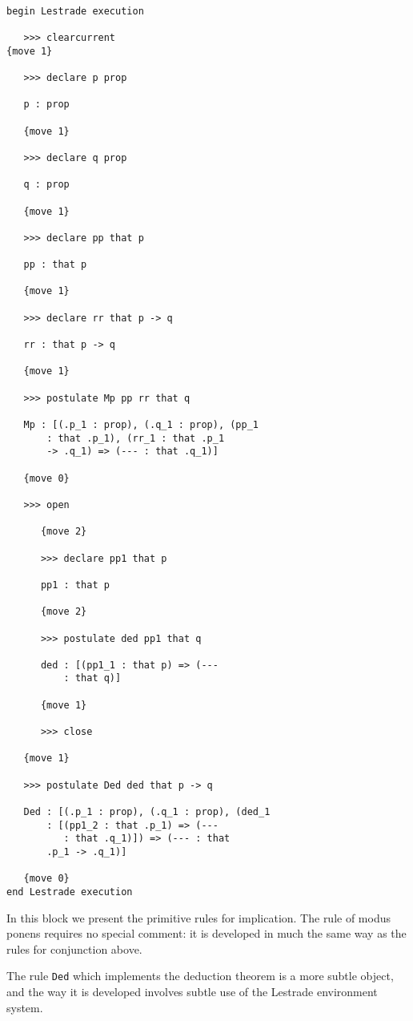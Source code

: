 \documentclass[12pt]{article}
\begin{document}
\begin{verbatim}

begin Lestrade execution

   >>> clearcurrent
{move 1}

   >>> declare p prop

   p : prop

   {move 1}

   >>> declare q prop

   q : prop

   {move 1}

   >>> declare pp that p

   pp : that p

   {move 1}

   >>> declare rr that p -> q

   rr : that p -> q

   {move 1}

   >>> postulate Mp pp rr that q

   Mp : [(.p_1 : prop), (.q_1 : prop), (pp_1 
       : that .p_1), (rr_1 : that .p_1 
       -> .q_1) => (--- : that .q_1)]

   {move 0}

   >>> open

      {move 2}

      >>> declare pp1 that p

      pp1 : that p

      {move 2}

      >>> postulate ded pp1 that q

      ded : [(pp1_1 : that p) => (--- 
          : that q)]

      {move 1}

      >>> close

   {move 1}

   >>> postulate Ded ded that p -> q

   Ded : [(.p_1 : prop), (.q_1 : prop), (ded_1 
       : [(pp1_2 : that .p_1) => (--- 
          : that .q_1)]) => (--- : that 
       .p_1 -> .q_1)]

   {move 0}
end Lestrade execution
\end{verbatim}

In this block we present the primitive rules for implication.  The rule of modus ponens requires no special comment:  it is developed in much the same way as
the rules for conjunction above.

The rule {\tt Ded} which implements the deduction theorem is a more subtle object, and the way it is developed involves subtle use of the Lestrade environment system.
\end{document}

